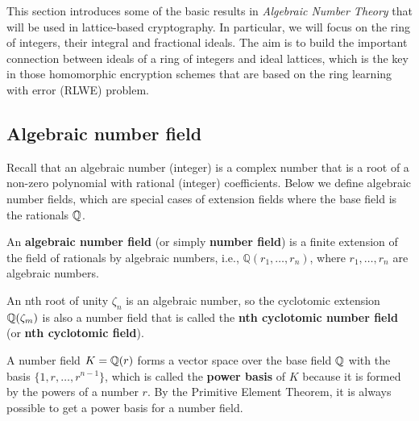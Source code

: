 \documentclass[../main.tex]{subfiles}
\begin{document}
\label{appen:ant}


This section introduces some of the basic results in \textit{Algebraic Number Theory} that will be used in lattice-based cryptography. In particular, we will focus on the ring of integers, their integral and fractional ideals. The aim is to build the important connection between ideals of a ring of integers and ideal lattices, which is the key in those homomorphic encryption schemes that are based on the ring learning with error (RLWE) problem. 

\subsection{Algebraic number field}
\label{app subsection:number field}


Recall that an algebraic number (integer) is a complex number that is a root of a non-zero polynomial with rational (integer) coefficients. Below we define algebraic number fields, which are special cases of extension fields where the base field is the rationals $\mathbb{Q}$.

\begin{definition}
\reversemarginpar
{}
An \textbf{algebraic number field} (or simply \textbf{number field}) is a finite extension of the field of rationals by algebraic numbers, i.e., $\mathbb{Q}(r_1, \dots, r_n)$, where $r_1, \dots, r_n$ are algebraic numbers.
\end{definition}

An 
\reversemarginpar
{}
nth root of unity $\zeta_n$ is an algebraic number, so the cyclotomic extension $\mathbb{Q}(\zeta_m)$ is also a number field that is called the 
\textbf{nth cyclotomic number field} (or \textbf{nth cyclotomic field}). 

A number field $K=\mathbb{Q}(r)$ forms a vector space over the base field $\mathbb{Q}$ with the basis $\{1,r,\dots,r^{n-1}\}$, which is called the 
\reversemarginpar
{}
\textbf{power basis} of $K$ because it is formed by the powers of a number $r$. By the Primitive Element Theorem, it is always possible to get a power basis for a number field.
\end{document}
